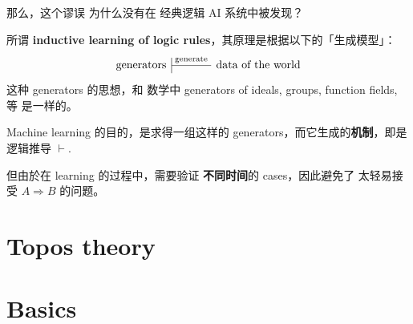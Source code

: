 那么，这个谬误 为什么没有在 经典逻辑 AI 系统中被发现？

所谓 \textbf{inductive learning of logic rules}，其原理是根据以下的「生成模型」： 
\begin{equation}
\begin{tikzcd}[| /.tip = {Bar[scale=3]}, column sep = large]
\mbox{generators} \arrow[|-,r, "\mathrm{generate}"]
& \mbox{data of the world}
\end{tikzcd}
\end{equation}
这种 generators 的思想，和 数学中 generators of ideals, groups, function fields, 等 是一样的。 

Machine learning 的目的，是求得一组这样的 generators，而它生成的\textbf{机制}，即是逻辑推导 $\vdash$.

但由於在 learning 的过程中，需要验证 \textbf{不同时间}的 cases，因此避免了 太轻易接受 $A \Rightarrow B$ 的问题。 

\section{Topos theory}

\section{Basics}

